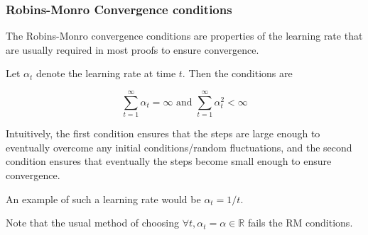 \documentclass[10pt,a4paper]{beamer}
\begin{document}
\begin{frame}
\frametitle{Robins-Monro Convergence conditions}

The Robins-Monro convergence conditions are properties of the learning rate that
are usually required in most proofs to ensure convergence.

Let $\alpha_t$ denote the learning rate at time $t$. Then the conditions are

$$
\sum_{t=1}^\infty \alpha_t = \infty \text{ and } \sum_{t=1}^\infty \alpha_t^2 < \infty
$$

Intuitively, the first condition ensures that the steps are large enough to eventually overcome
any initial conditions/random fluctuations, and the second condition ensures that eventually the 
steps become small enough to ensure convergence.
\pause 

An example of such a learning rate would be $\alpha_t = 1/t$.

Note that the usual method of choosing $\forall t, \alpha_t = \alpha \in \mathbb{R}$ 
fails the RM conditions.
\end{frame}

\fi
\end{document}
